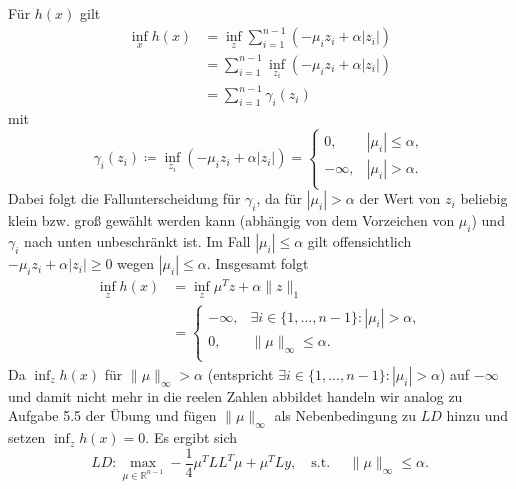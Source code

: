 \documentclass[ngerman, a4paper,12pt]{article}
\begin{document}
Für $h(x)$ gilt
\begin{equation*}
	\begin{split}
		\inf_x h(x)&=\inf_z \sum_{i=1}^{n-1}( -\mu_iz_i+\alpha|z_i|) \\
		  &= \sum_{i=1}^{n-1} \inf_{z_i} (-\mu_iz_i+\alpha|z_i|) \\
		  &= \sum_{i=1}^{n-1} \gamma_i (z_i)
		  \end{split}
\end{equation*}
mit 
\begin{equation*}
\gamma_i(z_i) \coloneqq \inf_{z_i}(-\mu_iz_i + \alpha |z_i|)= \begin{cases}
	0,& |\mu_i|\leq \alpha,\\
	-\infty,& |\mu_i|>\alpha.\\
\end{cases}
\end{equation*}
Dabei folgt die Fallunterscheidung für $\gamma_i$, da für $|\mu_i|>\alpha$ der Wert von $z_i$ beliebig klein bzw. groß gewählt werden kann (abhängig von dem Vorzeichen von $\mu_i$) und $\gamma_i$ nach unten unbeschränkt ist. Im Fall $|\mu_i|\leq \alpha$ gilt offensichtlich $-\mu_iz_i +\alpha|z_i| \geq 0$ wegen $|\mu_i| \leq \alpha$.
Insgesamt folgt 
\begin{equation*}
	\begin{split}
		\inf_z h(x) &=  \inf_{z} \mu^Tz+\alpha\|z\|_1 \\
		&=\begin{cases}
		-\infty,&\exists i \in \{1,..., n-1\}:|\mu_i | >\alpha,\\
		0,&\|\mu\|_\infty\leq\alpha.\\
		\end{cases}
	\end{split}
\end{equation*}
Da $\inf_z h(x)$ für $\| \mu \|_{\infty} > \alpha $ (entspricht $\exists i \in \{1,..., n-1\}:|\mu_i | >\alpha$) auf $-\infty$ und damit nicht mehr in die reelen Zahlen abbildet handeln wir analog zu Aufgabe 5.5 der Übung und fügen $\| \mu \|_{\infty}$ als Nebenbedingung zu $LD$ hinzu und setzen $\inf_z h(x)=0$. Es ergibt sich
\begin{equation*}
  LD:  \max_{\mu \in \mathbb{R}^{n-1}} -\frac{1}{4}\mu^TLL^T\mu + \mu^TLy,\quad \text{s.t. } \quad \|\mu\|_\infty\leq\alpha.
\end{equation*}
\end{document}

